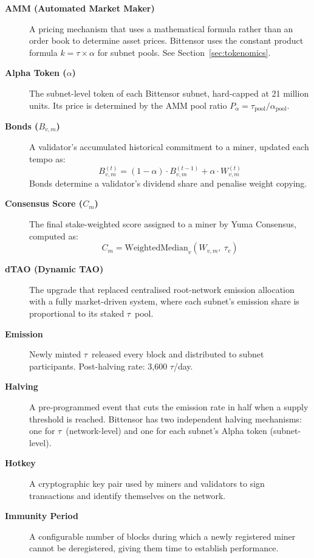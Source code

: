 \documentclass[12pt, a4paper, oneside]{report}
\newcommand{\TAO}{$\tau$}            %
\theoremstyle{definition}
\begin{document}
\begin{description}

  \item[\textbf{AMM (Automated Market Maker)}] A pricing mechanism that uses 
  a mathematical formula rather than an order book to determine asset prices. 
  Bittensor uses the constant product formula $k = \tau \times \alpha$ for 
  subnet pools. See Section~\ref{sec:tokenomics}.

  \item[\textbf{Alpha Token ($\alpha$)}] The subnet-level token of each 
  Bittensor subnet, hard-capped at 21 million units. Its price is determined 
  by the AMM pool ratio $P_{\alpha} = \tau_{\text{pool}} / \alpha_{\text{pool}}$.

  \item[\textbf{Bonds ($B_{v,m}$)}] A validator's accumulated historical 
  commitment to a miner, updated each tempo as:
  \[
    B_{v,m}^{(t)} = (1-\alpha) \cdot B_{v,m}^{(t-1)} + \alpha \cdot W_{v,m}^{(t)}
  \]
  Bonds determine a validator's dividend share and penalise weight copying.

  \item[\textbf{Consensus Score ($C_m$)}] The final stake-weighted score 
  assigned to a miner by Yuma Consensus, computed as:
  \[
    C_m = \text{WeightedMedian}_v(W_{v,m},\ \tau_v)
  \]

  \item[\textbf{dTAO (Dynamic TAO)}] The upgrade that replaced centralised 
  root-network emission allocation with a fully market-driven system, where 
  each subnet's emission share is proportional to its staked \TAO\ pool.

  \item[\textbf{Emission}] Newly minted \TAO\ released every block and 
  distributed to subnet participants. Post-halving rate: 3,600 \TAO/day.

  \item[\textbf{Halving}] A pre-programmed event that cuts the emission rate 
  in half when a supply threshold is reached. Bittensor has two independent 
  halving mechanisms: one for \TAO\ (network-level) and one for each subnet's 
  Alpha token (subnet-level).

  \item[\textbf{Hotkey}] A cryptographic key pair used by miners and validators 
  to sign transactions and identify themselves on the network.

  \item[\textbf{Immunity Period}] A configurable number of blocks during which 
  a newly registered miner cannot be deregistered, giving them time to 
  establish performance.


\end{description}
\end{document}
